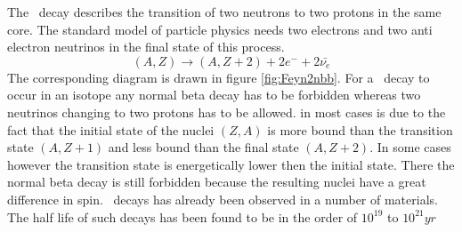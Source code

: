 \documentclass[encoding=utf8,british]{tumphthesis}
\begin{document}
The \twonu\ decay describes the transition of two neutrons to two protons in the same core.
The standard model of particle physics needs two electrons and two anti electron neutrinos in the final state of this process.
\begin{equation}
(A,Z)\rightarrow (A,Z+2) + 2e^- + 2\bar{\nu_e}
\end{equation} 
The corresponding diagram is drawn in figure \ref{fig:Feyn2nbb}.
For a \twonu\ decay to occur in an isotope any normal beta decay has to be forbidden whereas two neutrinos changing to two protons has to be allowed.
in most cases is due to the fact that the initial state of the nuclei $(Z,A)$ is more bound than the transition state $(A,Z+1)$ and less bound than the final state $(A,Z+2)$.
In some cases however the transition state is energetically lower then the initial state.
There the normal beta decay is still forbidden because the resulting nuclei have a great difference in spin.
\twonu\ decays has already been observed in a number of materials.
The half life of such decays has been found to be in the order of $10^{19}$ to $10^{21} \unit{yr}$
\\
\end{document}
